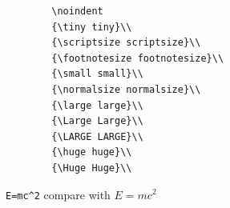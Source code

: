 \documentclass[20pt]{article}
\begin{document}
	
	\begin{verbatim}
		\noindent
		{\tiny tiny}\\
		{\scriptsize scriptsize}\\
		{\footnotesize footnotesize}\\
		{\small small}\\
		{\normalsize normalsize}\\
		{\large large}\\
		{\Large Large}\\
		{\LARGE LARGE}\\
		{\huge huge}\\
		{\Huge Huge}\\ 
	\end{verbatim}

	\verb*|E=mc^2| compare with $E=mc^2$
	
\end{document}
